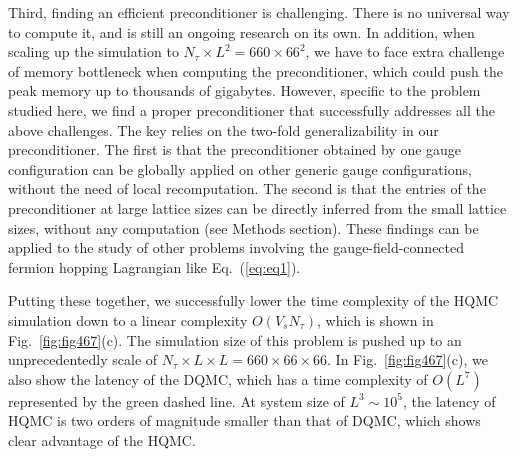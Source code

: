 \documentclass[aps,prl,twocolumn,superscriptaddress,showpacs,longbibliography]{revtex4-2}
\newcommand{\refeq}[1]{\textmd{Eq.\ }(\ref{#1})}
\newcommand{\reffg}[1]{\textmd{Fig.\ }\ref{#1}}
\begin{document}
Third, finding an efficient preconditioner is challenging. There is no universal way to compute it, and is still an ongoing research \cite{yamazaki2009high, beyl2018revisiting} on its own. In addition, when scaling up the simulation to $N_\tau \times L^2 = 660\times66^2$, we have to face extra challenge of memory bottleneck when computing the preconditioner, which could push the peak memory up to thousands of gigabytes. 
However, specific to the problem studied here, we find a proper preconditioner that successfully addresses all the above challenges. The key relies on the two-fold generalizability in our preconditioner. The first is that the preconditioner obtained by one gauge configuration can be globally applied on other generic gauge configurations, without the need of local recomputation. The second is that the entries of the preconditioner at large lattice sizes can be directly inferred from the small lattice sizes, without any computation (see Methods section). These findings can be applied to the study of other problems involving the gauge-field-connected fermion hopping Lagrangian like \refeq{eq:eq1}.

Putting these together, we successfully lower the time complexity of the HQMC simulation down to a linear complexity $O(V_sN_\tau)$, which is shown in \reffg{fig:fig467}(c). The simulation size of this problem is pushed up to an unprecedentedly scale of $N_\tau \times L\times L =660\times66 \times 66$. In \reffg{fig:fig467}(c), we also show the latency of the DQMC, which has a time complexity of $O(L^7)$ represented by the green dashed line. At system size of $L^3 \sim 10^5$, the latency of HQMC is two orders of magnitude smaller than that of DQMC, which shows clear advantage of the HQMC.



\end{document}
